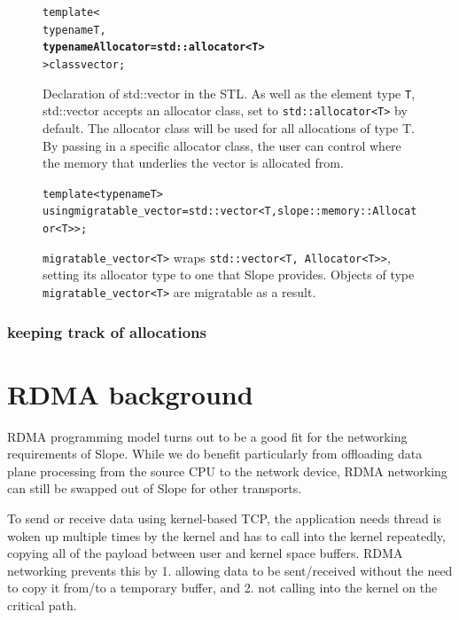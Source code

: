 \begin{figure}[t]
\begin{alltt}
template<
    typename T,
    \textbf{typename Allocator = std::allocator<T>}
> class vector;
\end{alltt}
\caption{
    Declaration of std::vector in the STL. As well as the element type \texttt{T},
    std::vector accepts an allocator class, set to \texttt{std{::}allocator<T>} by
    default. The allocator class will be used for all allocations of type T.
    By passing in a specific allocator class, the user can control where the
    memory that underlies the vector is allocated from.
}
\label{fig:stdvector}
\end{figure}



\begin{figure}[t]
\begin{alltt}
template<typename T>
using migratable_vector = std::vector<T, slope::memory::Allocator<T>>;

\end{alltt}
\caption{
\texttt{migratable\_vector<T>} wraps \texttt{std{::}vector<T, Allocator<T>>}, setting
its allocator type to one that Slope provides. Objects of type
\texttt{migratable\_vector<T>} are migratable as a result.
}
\label{fig:migvector}
\end{figure}





\subsubsection{keeping track of allocations}
\label{subsec:trackallocations}


\section{RDMA background}
RDMA programming model turns out to be a good fit for the networking
requirements of Slope. While we do benefit particularly from
offloading data plane processing from the source CPU to the network device,
RDMA networking can still be swapped out of Slope for other transports.

To send or receive data using kernel-based TCP, the application needs thread
is woken up multiple times by the kernel and has to call into the kernel
repeatedly, copying all of the payload between user and kernel space buffers.
RDMA networking prevents this by 1. allowing data to be sent/received without
the need to copy it from/to a temporary buffer, and 2. not calling into the
kernel on the critical path.

